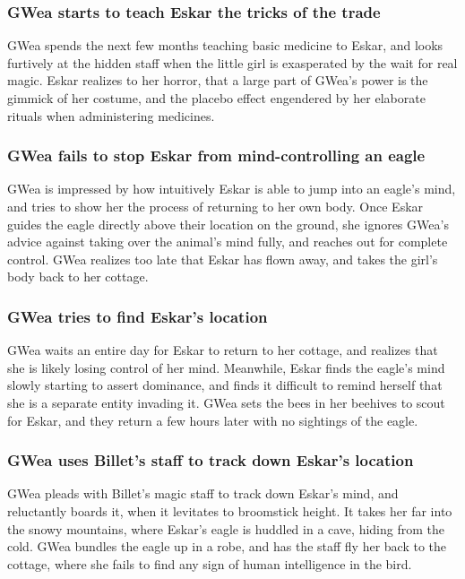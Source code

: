\subsubsection{\Gls{GWea} starts to teach \Gls{Eskar} the tricks of the trade}
\Gls{GWea} spends the next few months teaching basic medicine to \Gls{Eskar}, and looks furtively
at the hidden staff when the little girl is exasperated by the wait for real magic. \Gls{Eskar}
realizes to her horror, that a large part of \Gls{GWea}'s power is the gimmick of her costume, and
the placebo effect engendered by her elaborate rituals when administering medicines.

\subsubsection{\Gls{GWea} fails to stop \Gls{Eskar} from mind-controlling an eagle}
\Gls{GWea} is impressed by how intuitively \Gls{Eskar} is able to jump into an eagle's mind, and
tries to show her the process of returning to her own body. Once \Gls{Eskar} guides the eagle
directly above their location on the ground, she ignores \Gls{GWea}'s advice against taking over
the animal's mind fully, and reaches out for complete control. \Gls{GWea} realizes too late that
\Gls{Eskar} has flown away, and takes the girl's body back to her cottage.

\subsubsection{\Gls{GWea} tries to find \Gls{Eskar}'s location}
\Gls{GWea} waits an entire day for \Gls{Eskar} to return to her cottage, and realizes that she is
likely losing control of her mind. Meanwhile, \Gls{Eskar} finds the eagle's mind slowly starting to
assert dominance, and finds it difficult to remind herself that she is a separate entity invading
it. \Gls{GWea} sets the bees in her beehives to scout for \Gls{Eskar}, and they return a few hours
later with no sightings of the eagle.

\subsubsection{\Gls{GWea} uses \Gls{Billet}'s staff to track down \Gls{Eskar}'s location}
\Gls{GWea} pleads with \Gls{Billet}'s magic staff to track down \Gls{Eskar}'s mind, and reluctantly
boards it, when it levitates to broomstick height. It takes her far into the snowy mountains, where
\Gls{Eskar}'s eagle is huddled in a cave, hiding from the cold. \Gls{GWea} bundles the eagle up
in a robe, and has the staff fly her back to the cottage, where she fails to find any sign of human
intelligence in the bird.

